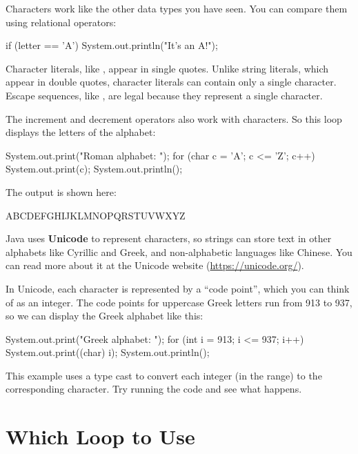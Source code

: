 Characters work like the other data types you have seen.
You can compare them using relational operators:

\begin{code}
if (letter == 'A') {
    System.out.println("It's an A!");
}
\end{code}


Character literals, like , appear in single quotes.
Unlike string literals, which appear in double quotes, character literals can contain only a single character.
Escape sequences, like , are legal because they represent a single character.

The increment and decrement operators also work with characters.
So this loop displays the letters of the alphabet:

\begin{code}
System.out.print("Roman alphabet: ");
for (char c = 'A'; c <= 'Z'; c++) {
    System.out.print(c);
}
System.out.println();
\end{code}

The output is shown here:

\begin{stdout}
ABCDEFGHIJKLMNOPQRSTUVWXYZ
\end{stdout}


Java uses {\bf Unicode} to represent characters, so strings can store text in other alphabets like Cyrillic and Greek, and non-alphabetic languages like Chinese.
You can read more about it at the Unicode website (\url{https://unicode.org/}).

In Unicode, each character is represented by a ``code point'', which you can think of as an integer.
The code points for uppercase Greek letters run from 913 to 937, so we can display the Greek alphabet like this:

\begin{code}
System.out.print("Greek alphabet: ");
for (int i = 913; i <= 937; i++) {
    System.out.print((char) i);
}
System.out.println();
\end{code}

This example uses a type cast to convert each integer (in the range) to the corresponding character.
Try running the code and see what happens.


\section{Which Loop to Use}
\label{loops-strings_which-loop-to-use}


